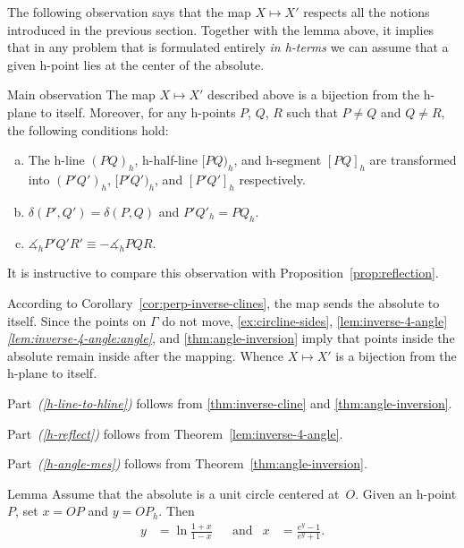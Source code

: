 The following observation says that the map $X\mapsto X'$ respects all the notions introduced in the previous section.
Together with the lemma above, it implies that in any problem that is formulated entirely \textit{in h-terms} we can assume that a given h-point lies at the center of the absolute.

\begin{thm}{Main observation}\label{thm:main-observ}
The map $X\mapsto X'$ described above is a bijection from the h-plane to itself. 
Moreover, for any h-points $P$, $Q$, $R$ such that $P\ne Q$ and $Q\ne R$, the following conditions hold:
\begin{enumerate}[(a)]
\item\label{h-line-to-hline} The h-line $(PQ)_h$, h-half-line $[PQ)_h$, and h-segment $[PQ]_h$ are transformed into $(P'Q')_h$, $[P'Q')_h$, and $[P'Q']_h$ respectively.
\item\label{h-reflect} $\delta(P',Q')=\delta(P,Q)$ and $P'Q'_h=PQ_h$.
\item\label{h-angle-mes} 
$\measuredangle_h P'Q'R'\equiv-\measuredangle_h PQR$.
\end{enumerate}

\end{thm}

It is instructive to compare this observation with Proposition~\ref{prop:reflection}.

According to Corollary~\ref{cor:perp-inverse-clines}, the map sends the absolute to itself.
Since the points on $\Gamma$ do not move,
\ref{ex:circline-sides}, \ref{lem:inverse-4-angle}\textit{\ref{lem:inverse-4-angle:angle}}, and \ref{thm:angle-inversion} imply that points inside the absolute remain inside after the mapping.
Whence $X\mapsto X'$ is a bijection from the h-plane to itself.

Part~\textit{(\ref{h-line-to-hline})} follows from \ref{thm:inverse-cline} and \ref{thm:angle-inversion}.

Part~\textit{(\ref{h-reflect})} follows from Theorem~\ref{lem:inverse-4-angle}.

Part~\textit{(\ref{h-angle-mes})} follows from Theorem~\ref{thm:angle-inversion}.
\qeds


\begin{thm}{Lemma}\label{lem:O-h-dist}
Assume that the absolute is a unit circle centered at~$O$.
Given an h-point $P$, set $x=OP$ and $y=OP_h$.
Then
\begin{align*}
y&=\ln\frac{1+x}{1-x}
&
&\text{and}
&
x&=\frac{e^y-1}{e^y+1}.
\end{align*}
 
\end{thm}

